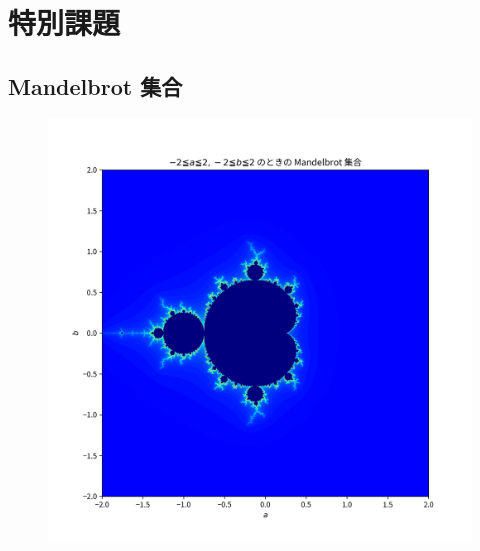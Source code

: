 \section{特別課題}
\subsection{Mandelbrot 集合}
\begin{figure}[htbp]
  \centering
  \includegraphics[keepaspectratio, scale=0.8]{images/OtherProblem/ctest5_1.png}
\end{figure}
